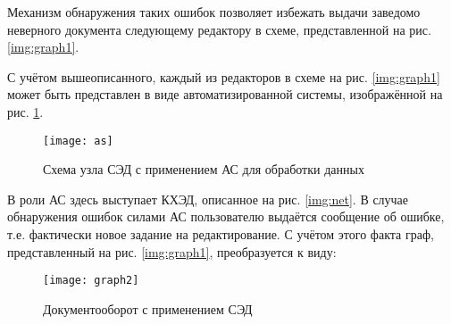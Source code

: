 Механизм обнаружения таких ошибок позволяет избежать выдачи заведомо неверного документа следующему редактору в схеме, представленной на рис. \ref{img:graph1}.

\vspace{\baselineskip}
С учётом вышеописанного, каждый из редакторов в схеме на рис. \ref{img:graph1} может быть представлен в виде автоматизированной системы, изображённой на рис. \ref{img:as}.

\begin{figure}[h]
  \centering
  \texttt{[image: as]}
  \caption{Схема узла СЭД с применением АС для обработки данных}
  \label{img:as}
\end{figure}

В роли АС здесь выступает КХЭД, описанное на рис. \ref{img:net}. В случае обнаружения ошибок силами АС пользователю выдаётся сообщение об ошибке, т.е. фактически новое задание на редактирование. С учётом этого факта граф, представленный на рис. \ref{img:graph1}, преобразуется к виду:

\begin{figure}[h]
  \centering
  \texttt{[image: graph2]}
  \caption{Документооборот с применением СЭД}
  \label{img:graph2}
\end{figure}

